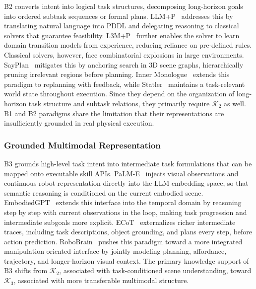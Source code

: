 \documentclass[acmsmall,screen,review]{acmart}
\begin{document}
B2 converts intent into logical task structures, decomposing long-horizon goals into ordered subtask sequences or formal plans. 
LLM+P~\cite{liu2023llmp} addresses this by translating natural language into PDDL and delegating reasoning to classical solvers that guarantee feasibility. 
L3M+P~\cite{agarwal2025l3mp} further enables the solver to learn domain transition models from experience, reducing reliance on pre-defined rules.  
Classical solvers, however, face combinatorial explosions in large environments. SayPlan~\cite{rana2023sayplan} mitigates this by anchoring search in 3D scene graphs, hierarchically pruning irrelevant regions before planning.
Inner Monologue~\cite{huang2023inner} extends this paradigm to replanning with feedback, while Statler~\cite{yoneda2024statler} maintains a task-relevant world state throughout execution.
Since they depend on the organization of long-horizon task structure and subtask relations, they primarily require \(\mathcal{K}_2\) as well.
B1 and B2 paradigms share the limitation that their representations are insufficiently grounded in real physical execution.

\subsubsection{Grounded Multimodal Representation}\label{sec:multimodal_reasoning}

B3 grounds high-level task intent into intermediate task formulations that can be mapped onto executable skill APIs.
PaLM-E~\cite{driess2023palme} injects visual observations and continuous robot representation directly into the LLM embedding space, so that semantic reasoning is conditioned on the current embodied scene.
EmbodiedGPT~\cite{mu2023embodiedgpt} extends this interface into the temporal domain by reasoning step by step with current observations in the loop, making task progression and intermediate subgoals more explicit.
ECoT~\cite{zawalski2025ecot} externalizes richer intermediate traces, including task descriptions, object grounding, and plans every step, before action prediction.
RoboBrain~\cite{ji2025robobrain} pushes this paradigm toward a more integrated manipulation-oriented interface by jointly modeling planning, affordance, trajectory, and longer-horizon visual context.
The primary knowledge support of B3 shifts from \(\mathcal{K}_2\), associated with task-conditioned scene understanding, toward \(\mathcal{K}_3\), associated with more transferable multimodal structure.
\end{document}
